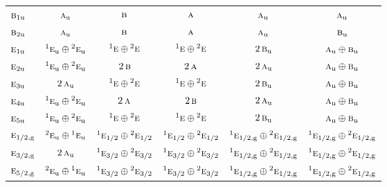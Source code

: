 \documentclass[10pt,a4paper]{article}
\numberwithin{equation}{section}
\newcommand{\irr}[1]{\text{\normalfont\scshape #1}}
\newcommand{\conjpair}[1]{{}^{#1}}
\newcommand{\ptag}[1]{\mathrm{#1}}
\begin{document}
{\begin{longtable}{@{}lccccc@{}}
$\irr{b}_{1\ptag{u}}$ & $\irr{a}_{\ptag{u}}$ & $\irr{b}$ & $\irr{a}$ & $\irr{a}_{\ptag{u}}$ & $\irr{a}_{\ptag{u}}$\\
$\irr{b}_{2\ptag{u}}$ & $\irr{a}_{\ptag{u}}$ & $\irr{b}$ & $\irr{a}$ & $\irr{a}_{\ptag{u}}$ & $\irr{b}_{\ptag{u}}$\\
$\irr{e}_{1\ptag{u}}$ & $\conjpair{1}\irr{e}_{\ptag{u}}\oplus \conjpair{2}\irr{e}_{\ptag{u}}$ & $\conjpair{1}\irr{e}\oplus \conjpair{2}\irr{e}$ & $\conjpair{1}\irr{e}\oplus \conjpair{2}\irr{e}$ & $2\,\irr{b}_{\ptag{u}}$ & $\irr{a}_{\ptag{u}}\oplus \irr{b}_{\ptag{u}}$\\
$\irr{e}_{2\ptag{u}}$ & $\conjpair{1}\irr{e}_{\ptag{u}}\oplus \conjpair{2}\irr{e}_{\ptag{u}}$ & $2\,\irr{b}$ & $2\,\irr{a}$ & $2\,\irr{a}_{\ptag{u}}$ & $\irr{a}_{\ptag{u}}\oplus \irr{b}_{\ptag{u}}$\\
$\irr{e}_{3\ptag{u}}$ & $2\,\irr{a}_{\ptag{u}}$ & $\conjpair{1}\irr{e}\oplus \conjpair{2}\irr{e}$ & $\conjpair{1}\irr{e}\oplus \conjpair{2}\irr{e}$ & $2\,\irr{b}_{\ptag{u}}$ & $\irr{a}_{\ptag{u}}\oplus \irr{b}_{\ptag{u}}$\\
$\irr{e}_{4\ptag{u}}$ & $\conjpair{1}\irr{e}_{\ptag{u}}\oplus \conjpair{2}\irr{e}_{\ptag{u}}$ & $2\,\irr{a}$ & $2\,\irr{b}$ & $2\,\irr{a}_{\ptag{u}}$ & $\irr{a}_{\ptag{u}}\oplus \irr{b}_{\ptag{u}}$\\
$\irr{e}_{5\ptag{u}}$ & $\conjpair{1}\irr{e}_{\ptag{u}}\oplus \conjpair{2}\irr{e}_{\ptag{u}}$ & $\conjpair{1}\irr{e}\oplus \conjpair{2}\irr{e}$ & $\conjpair{1}\irr{e}\oplus \conjpair{2}\irr{e}$ & $2\,\irr{b}_{\ptag{u}}$ & $\irr{a}_{\ptag{u}}\oplus \irr{b}_{\ptag{u}}$\\
$\irr{e}_{1/2,\ptag{g}}$ & $\conjpair{2}\irr{e}_{\ptag{u}}\oplus \conjpair{1}\irr{e}_{\ptag{u}}$ & $\conjpair{1}\irr{e}_{1/2}\oplus \conjpair{2}\irr{e}_{1/2}$ & $\conjpair{1}\irr{e}_{1/2}\oplus \conjpair{2}\irr{e}_{1/2}$ & $\conjpair{1}\irr{e}_{1/2,\ptag{g}}\oplus \conjpair{2}\irr{e}_{1/2,\ptag{g}}$ & $\conjpair{1}\irr{e}_{1/2,\ptag{g}}\oplus \conjpair{2}\irr{e}_{1/2,\ptag{g}}$\\
$\irr{e}_{3/2,\ptag{g}}$ & $2\,\irr{a}_{\ptag{u}}$ & $\conjpair{1}\irr{e}_{3/2}\oplus \conjpair{2}\irr{e}_{3/2}$ & $\conjpair{1}\irr{e}_{3/2}\oplus \conjpair{2}\irr{e}_{3/2}$ & $\conjpair{1}\irr{e}_{1/2,\ptag{g}}\oplus \conjpair{2}\irr{e}_{1/2,\ptag{g}}$ & $\conjpair{1}\irr{e}_{1/2,\ptag{g}}\oplus \conjpair{2}\irr{e}_{1/2,\ptag{g}}$\\
$\irr{e}_{5/2,\ptag{g}}$ & $\conjpair{2}\irr{e}_{\ptag{u}}\oplus \conjpair{1}\irr{e}_{\ptag{u}}$ & $\conjpair{1}\irr{e}_{3/2}\oplus \conjpair{2}\irr{e}_{3/2}$ & $\conjpair{1}\irr{e}_{3/2}\oplus \conjpair{2}\irr{e}_{3/2}$ & $\conjpair{1}\irr{e}_{1/2,\ptag{g}}\oplus \conjpair{2}\irr{e}_{1/2,\ptag{g}}$ & $\conjpair{1}\irr{e}_{1/2,\ptag{g}}\oplus \conjpair{2}\irr{e}_{1/2,\ptag{g}}$\\

\end{longtable}}
\end{document}
